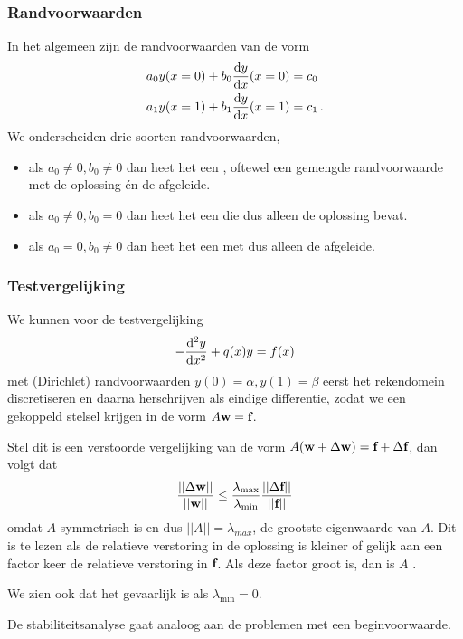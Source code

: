 \documentclass{2wn20summary}
\begin{document}
		 \subsubsection{Randvoorwaarden}
		 In het algemeen zijn de randvoorwaarden van de vorm
		 \begin{align*}
			 a_0 y(x=0) + b_0 \frac{\mathop{}\!\mathrm{d} y}{\mathop{}\!\mathrm{d} x} (x=0) &= c_0 \\
			 a_1 y(x=1) + b_1 \frac{\mathop{}\!\mathrm{d} y}{\mathop{}\!\mathrm{d} x} (x=1) &= c_1 \,.
		 \end{align*}
		 We onderscheiden drie soorten randvoorwaarden,
		 \begin{itemize}
		 	\item als $a_0 \neq 0, b_0 \neq 0$ dan heet het een , oftewel een gemengde randvoorwaarde met de oplossing \'en de afgeleide.
		 	\item als $a_0 \neq 0, b_0 = 0$ dan heet het een  die dus alleen de oplossing bevat.
		 	\item als $a_0 =0, b_0 \neq 0$ dan heet het een  met dus alleen de afgeleide.
		 \end{itemize}
		 
		 \subsubsection{Testvergelijking}
		 We kunnen voor de testvergelijking 
		 \[ 
			 - \frac{\mathop{}\!\mathrm{d}^2 y}{\mathop{}\!\mathrm{d} x^2} + q(x) y = f(x)
		  \]
		  met (Dirichlet) randvoorwaarden $y(0) = \alpha, y(1) =\beta$
		  eerst het rekendomein discretiseren en daarna herschrijven als eindige differentie, zodat we een gekoppeld stelsel krijgen in de vorm $A {\textbf{w}} = {\textbf{f}}$. 
		  
		  Stel dit is een verstoorde vergelijking van de vorm $A ({\textbf{w}} + \Delta {\textbf{w}} ) = {\textbf{f}} + \Delta {\textbf{f}} $, dan volgt dat
		  \[ 
			  \frac{|| \Delta {\textbf{w}} ||}{||{\textbf{w}} ||} \le \frac{\lambda_{\max}}{\lambda_{\min}} \frac{|| \Delta {\textbf{f}} ||}{|| {\textbf{f}} ||}
		   \] 
		   omdat $A$ symmetrisch is en dus $||A|| =\lambda_{max}$, de grootste eigenwaarde van $A$. Dit is te lezen als de relatieve verstoring in de oplossing is kleiner of gelijk aan een factor keer de relatieve verstoring in ${\textbf{f}} $. Als deze factor groot is, dan is $A$ .
		   
		   We zien ook dat het gevaarlijk is als $\lambda_{\min}=0$.
		   
		   De stabiliteitsanalyse gaat analoog aan de problemen met een beginvoorwaarde.
		   
\end{document}
